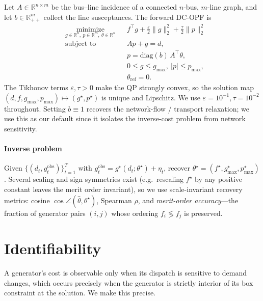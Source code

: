 \documentclass[conference]{IEEEtran}
\newcommand{\R}{\mathbb{R}}
\newcommand{\opt}{^{\star}}
\begin{document}
Let $A\in\R^{n\times m}$ be the bus--line incidence of a connected
$n$-bus, $m$-line graph, and let $b\in\R^m_{++}$ collect the line
susceptances. The forward DC-OPF is
\begin{equation}
\begin{aligned}
& \underset{g\in\R^n,\ p\in\R^m,\ \theta\in\R^n}{\text{minimize}} && f^\top g + \tfrac{\varepsilon}{2}\|g\|_2^2 + \tfrac{\tau}{2}\|p\|_2^2 \\
& \text{subject to}                           && Ap + g = d, \\
&                                             && p = \mathrm{diag}(b)\,A^\top \theta, \\
&                                             && 0 \le g \le g_{\max},\ \lvert p\rvert\le p_{\max}, \\
&                                             && \theta_{\mathrm{ref}}=0.
\end{aligned}
\label{eq:forward}
\end{equation}
The Tikhonov terms $\varepsilon,\tau>0$ make the QP strongly convex, so the
solution map $(d, f, g_{\max}, p_{\max}) \mapsto (g\opt, p\opt)$ is unique
and Lipschitz. We use $\varepsilon=10^{-1},\tau=10^{-2}$ throughout. Setting
$b\equiv 1$ recovers the network-flow / transport relaxation; we use this
as our default since it isolates the inverse-cost problem from network
sensitivity.

\paragraph*{Inverse problem} Given $\{(d_t,g_t^{\mathrm{obs}})\}_{t=1}^T$
with $g_t^{\mathrm{obs}}=g\opt(d_t;\theta\opt)+\eta_t$, recover
$\theta\opt = (f\opt,g_{\max}\opt,p_{\max}\opt)$. Several scaling and
sign symmetries exist (e.g.\ rescaling $f\opt$ by any positive constant
leaves the merit order invariant), so we use scale-invariant recovery
metrics: cosine $\cos\angle(\hat\theta,\theta\opt)$, Spearman $\rho$, and
\emph{merit-order accuracy}---the fraction of generator pairs $(i,j)$ whose
ordering $f_i \lessgtr f_j$ is preserved.

\section{Identifiability}
\label{sec:ident}

A generator's cost is observable only when its dispatch is sensitive to
demand changes, which occurs precisely when the generator is strictly
interior of its box constraint at the solution. We make this precise.
\end{document}
